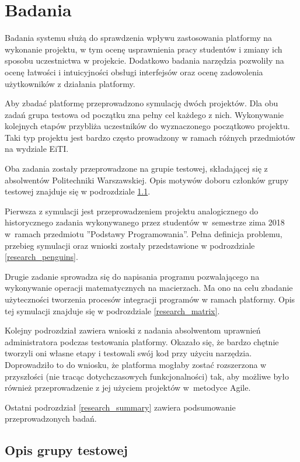 \chapter{Badania}
\label{chapter:research}

Badania systemu służą do sprawdzenia wpływu zastosowania platformy na wykonanie projektu, w tym ocenę usprawnienia pracy studentów i zmiany ich sposobu uczestnictwa w projekcie.
Dodatkowo badania narzędzia pozwoliły na ocenę łatwości i intuicyjności obsługi interfejsów oraz ocenę zadowolenia użytkowników z działania platformy.

Aby zbadać platformę przeprowadzono symulację dwóch projektów.
Dla obu zadań grupa testowa od początku zna pełny cel każdego z nich.
Wykonywanie kolejnych etapów przybliża uczestników do wyznaczonego początkowo projektu.
Taki typ projektu jest bardzo często prowadzony w ramach różnych przedmiotów na wydziale EiTI.

Oba zadania zostały przeprowadzone na grupie testowej, składającej się z absolwentów Politechniki Warszawskiej.
Opis motywów doboru członków grupy testowej znajduje się w podrozdziale \ref{research_group}.

Pierwsza z symulacji jest przeprowadzeniem projektu analogicznego do historycznego zadania wykonywanego przez studentów w~semestrze zima 2018 w~ramach przedmiotu ”Podstawy Programowania”.
Pełna definicja problemu, przebieg symulacji oraz wnioski zostały przedstawione w podrozdziale \ref{research_penguins}.

Drugie zadanie sprowadza się do napisania programu pozwalającego na wykonywanie operacji matematycznych na macierzach.
Ma ono na celu zbadanie użyteczności tworzenia procesów integracji programów w ramach platformy.
Opis tej symulacji znajduje się w podrozdziale \ref{research_matrix}.

Kolejny podrozdział zawiera wnioski z nadania absolwentom uprawnień administratora podczas testowania platformy.
Okazało się, że bardzo chętnie tworzyli oni własne etapy i testowali swój kod przy użyciu narzędzia.
Doprowadziło to do wniosku, że platforma mogłaby zostać rozszerzona w przyszłości (nie tracąc dotychczasowych funkcjonalności) tak, aby możliwe było również przeprowadzenie z jej użyciem projektów w~metodyce Agile.

Ostatni podrozdział \ref{research_summary} zawiera podsumowanie przeprowadzonych badań.


\section{Opis grupy testowej}
\label{research_group}


